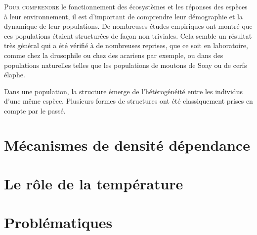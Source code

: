\lettrine[lines=3]{P}{our comprendre} le fonctionnement des écosystèmes et les
réponses des espèces à leur environnement, il est d'important de comprendre leur démographie et la
dynamique de leur populations. De nombreuses études empiriques ont montré que
ces populations étaient structurées de façon non triviales. Cela semble un 
résultat très général qui a été vérifié à de nombreuses reprises, que ce soit en
laboratoire, comme chez la drosophile ou chez des acariens par exemple, ou dans
des populations naturelles telles que les populations de moutons de Soay ou de cerfs
élaphe. 

Dans une population, la structure émerge de l'hétérogénéité entre les
individus d'une même espèce. Plusieurs formes de structures ont été
classiquement prises en compte par le passé. 

\section{Mécanismes de densité dépendance}

\section{Le rôle de la température}

\section{Problématiques}	
